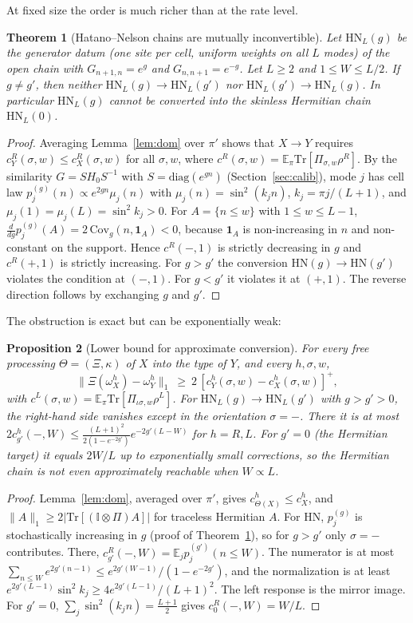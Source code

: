 \documentclass[11pt]{article}
\newtheorem{theorem}{Theorem}
\newtheorem{proposition}[theorem]{Proposition}
\theoremstyle{definition}
\theoremstyle{remark}
\newcommand{\Tr}{\mathrm{Tr}}
\newcommand{\E}{\mathbb{E}}
\newcommand{\one}{\mathbb{I}}
\newcommand{\isig}{\iota\sigma}
\begin{document}
At fixed size the order is much richer than at the rate level.

\begin{theorem}[Hatano--Nelson chains are mutually inconvertible]\label{thm:HNinc}
Let $\mathrm{HN}_L(g)$ be the generator datum (one site per cell, uniform weights on all $L$ modes) of the open chain with $G_{n+1,n}=e^{g}$ and $G_{n,n+1}=e^{-g}$. Let $L\ge2$ and $1\le W\le L/2$. If $g\ne g'$, then neither $\mathrm{HN}_L(g)\to\mathrm{HN}_L(g')$ nor $\mathrm{HN}_L(g')\to\mathrm{HN}_L(g)$. In particular $\mathrm{HN}_L(g)$ cannot be converted into the skinless Hermitian chain $\mathrm{HN}_L(0)$.
\end{theorem}
\begin{proof}
Averaging Lemma~\ref{lem:dom} over $\pi'$ shows that $X\to Y$ requires $c^R_Y(\sigma,w)\le c^R_X(\sigma,w)$ for all $\sigma,w$, where $c^R(\sigma,w)=\E_\pi\Tr[\Pi_{\sigma,w}\rho^R]$. By the similarity $G=SH_0S^{-1}$ with $S=\mathrm{diag}(e^{gn})$ (Section~\ref{sec:calib}), mode $j$ has cell law $p^{(g)}_j(n)\propto e^{2gn}\mu_j(n)$ with $\mu_j(n)=\sin^2(k_jn)$, $k_j=\pi j/(L+1)$, and $\mu_j(1)=\mu_j(L)=\sin^2k_j>0$. For $A=\{n\le w\}$ with $1\le w\le L-1$, $\frac{d}{dg}p^{(g)}_j(A)=2\,\mathrm{Cov}_g(n,\mathbf 1_A)<0$, because $\mathbf 1_A$ is non-increasing in $n$ and non-constant on the support. Hence $c^R(-,1)$ is strictly decreasing in $g$ and $c^R(+,1)$ is strictly increasing. For $g>g'$ the conversion $\mathrm{HN}(g)\to\mathrm{HN}(g')$ violates the condition at $(-,1)$. For $g<g'$ it violates it at $(+,1)$. The reverse direction follows by exchanging $g$ and $g'$.
\end{proof}

The obstruction is exact but can be exponentially weak:

\begin{proposition}[Lower bound for approximate conversion]\label{prop:approx}
For every free processing $\Theta=(\Xi,\kappa)$ of $X$ into the type of $Y$, and every $h,\sigma,w$,
\[
\|\Xi(\omega^h_X)-\omega^h_Y\|_1\ \ge\ 2\,[c^h_Y(\sigma,w)-c^h_X(\sigma,w)]^+ ,
\]
with $c^L(\sigma,w)=\E_\pi\Tr[\Pi_{\isig,w}\rho^L]$. For $\mathrm{HN}_L(g)\to\mathrm{HN}_L(g')$ with $g>g'>0$, the right-hand side vanishes except in the orientation $\sigma=-$. There it is at most $2c^h_{g'}(-,W)\le\frac{(L+1)^2}{2(1-e^{-2g'})}e^{-2g'(L-W)}$ for $h=R,L$. For $g'=0$ (the Hermitian target) it equals $2W/L$ up to exponentially small corrections, so the Hermitian chain is not even approximately reachable when $W\propto L$.
\end{proposition}
\begin{proof}
Lemma~\ref{lem:dom}, averaged over $\pi'$, gives $c^h_{\Theta(X)}\le c^h_X$, and $\|A\|_1\ge2|\Tr[(\one\otimes\Pi)A]|$ for traceless Hermitian $A$. For HN, $p^{(g)}_j$ is stochastically increasing in $g$ (proof of Theorem~\ref{thm:HNinc}), so for $g>g'$ only $\sigma=-$ contributes. There, $c^R_{g'}(-,W)=\E_jp^{(g')}_j(n\le W)$. The numerator is at most $\sum_{n\le W}e^{2g'(n-1)}\le e^{2g'(W-1)}/(1-e^{-2g'})$, and the normalization is at least $e^{2g'(L-1)}\sin^2k_j\ge4e^{2g'(L-1)}/(L+1)^2$. The left response is the mirror image. For $g'=0$, $\sum_j\sin^2(k_jn)=\frac{L+1}2$ gives $c^R_0(-,W)=W/L$.
\end{proof}
\end{document}
